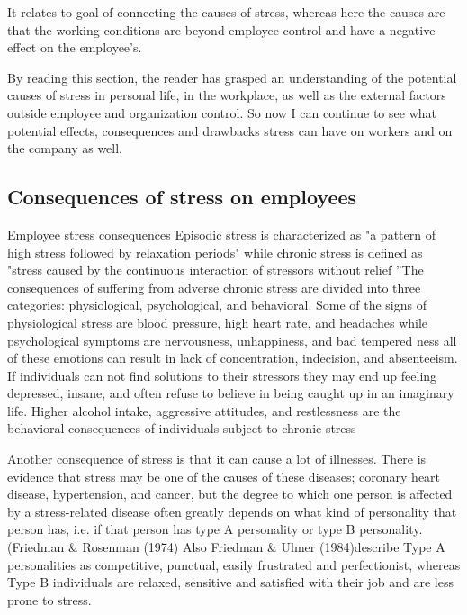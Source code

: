 It relates to goal of connecting the causes of stress, whereas here the causes are that the working conditions are beyond employee control and have a negative effect on the employee's\cite[p.~10]{Fairbrother2003WorkplaceSatisfaction}.

By reading this section, the reader has grasped an understanding of the potential causes of stress in personal life, in the workplace, as well as the external factors outside employee and organization control.  So now I can continue to see what potential effects, consequences and drawbacks stress can have on workers and on the company as well.

\subsection{Consequences of stress on employees}
Employee stress consequences Episodic stress is characterized as "a pattern of high stress followed by relaxation periods" while chronic stress is defined as "stress caused by the continuous interaction of stressors without relief \citep[p.313]{Bloisi2007ManagementBehaviour}”The consequences of suffering from adverse chronic stress are divided into three categories: physiological, psychological, and behavioral. Some of the signs of physiological stress are blood pressure, high heart rate, and headaches while psychological symptoms are nervousness, unhappiness, and bad tempered ness all of these emotions can result in lack of concentration, indecision, and absenteeism. If individuals can not find solutions to their stressors they may end up feeling depressed, insane, and often refuse to believe in being caught up in an imaginary life. Higher alcohol intake, aggressive attitudes, and restlessness are the behavioral consequences of individuals subject to chronic stress \citep[p.323]{Bloisi2007ManagementBehaviour}

Another consequence of stress is that it can cause a lot of illnesses.  There is evidence that stress may be one of the causes of these diseases; coronary heart disease, hypertension, and cancer, but the degree to which one person is affected by a stress-related disease often greatly depends on what kind of personality that person has, i.e. if that person has type A personality or type B personality.  (Friedman  \&  Rosenman  (1974)  Also  Friedman  \&  Ulmer (1984)describe Type A personalities as competitive, punctual, easily frustrated and perfectionist, whereas Type B individuals are relaxed, sensitive and satisfied with their job and are less prone to stress.

